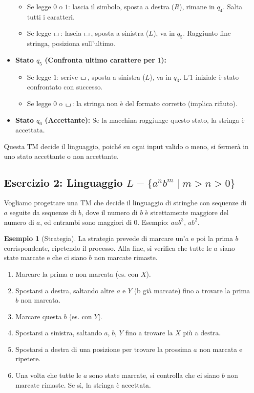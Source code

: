 \documentclass[a4paper]{article}
\theoremstyle{definition} %
\newtheorem{example}{Esempio}
\newcommand{\blankS}{\ensuremath{\raisebox{-0.15ex}{\scalebox{1.3}[0.7]{$\sqcup$}}\mkern2mu}}
\begin{document}
\begin{itemize}
    \begin{itemize}
        \item Se legge $0$ o $1$: lascia il simbolo, sposta a destra ($R$), rimane in $q_4$. Salta tutti i caratteri.
        \item Se legge \blankS: lascia \blankS, sposta a sinistra ($L$), va in $q_5$. Raggiunto fine stringa, posiziona sull'ultimo.
    \end{itemize}
    \item \textbf{Stato $q_5$ (Confronta ultimo carattere per $1$):}
    \begin{itemize}
        \item Se legge $1$: scrive \blankS, sposta a sinistra ($L$), va in $q_3$. L'$1$ iniziale è stato confrontato con successo.
        \item Se legge $0$ o \blankS: la stringa non è del formato corretto (implica rifiuto).
    \end{itemize}
    \item \textbf{Stato $q_6$ (Accettante):} Se la macchina raggiunge questo stato, la stringa è accettata.
\end{itemize}
Questa TM decide il linguaggio, poiché su ogni input valido o meno, si fermerà in uno stato accettante o non accettante.

\subsection{Esercizio 2: Linguaggio $L = \{a^n b^m \mid m > n > 0\}$}

Vogliamo progettare una TM che decide il linguaggio di stringhe con sequenze di $a$ seguite da sequenze di $b$, dove il numero di $b$ è strettamente maggiore del numero di $a$, ed entrambi sono maggiori di $0$. Esempio: $aab^{3}$, $ab^{2}$.

\begin{example}[Strategia]
La strategia prevede di marcare un'$a$ e poi la prima $b$ corrispondente, ripetendo il processo. Alla fine, si verifica che tutte le $a$ siano state marcate e che ci siano $b$ non marcate rimaste.
\begin{enumerate}
    \item Marcare la prima $a$ non marcata (es. con $X$).
    \item Spostarsi a destra, saltando altre $a$ e $Y$ (b già marcate) fino a trovare la prima $b$ non marcata.
    \item Marcare questa $b$ (es. con $Y$).
    \item Spostarsi a sinistra, saltando $a$, $b$, $Y$ fino a trovare la $X$ più a destra.
    \item Spostarsi a destra di una posizione per trovare la prossima $a$ non marcata e ripetere.
    \item Una volta che tutte le $a$ sono state marcate, si controlla che ci siano $b$ non marcate rimaste. Se sì, la stringa è accettata.
\end{enumerate}
\end{example}
\end{document}
